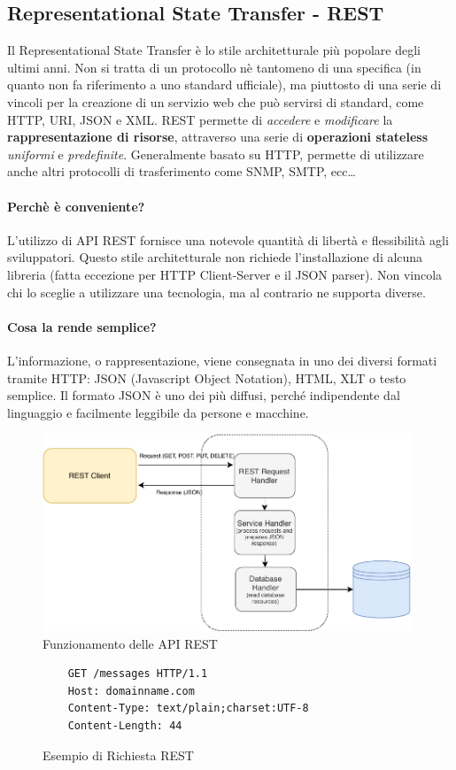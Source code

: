 \subsection{Representational State Transfer - REST}
Il Representational State Transfer è lo stile architetturale più popolare degli ultimi anni. Non si tratta di un protocollo nè tantomeno di una specifica (in quanto non fa riferimento a uno standard ufficiale), ma piuttosto di una serie di vincoli per la creazione di un servizio web che può servirsi di standard,  come HTTP, URI, JSON e XML. REST permette di \textit{accedere} e \textit{modificare} la \textbf{rappresentazione di risorse}, attraverso una serie di \textbf{operazioni stateless} \textit{uniformi} e \textit{predefinite}. Generalmente basato su HTTP, permette di utilizzare anche altri protocolli di trasferimento come SNMP, SMTP, ecc\dots

\paragraph{Perchè è conveniente?} L'utilizzo di API REST fornisce una notevole quantità di libertà e flessibilità agli sviluppatori. Questo stile architetturale non richiede l'installazione di alcuna libreria (fatta eccezione per HTTP Client-Server e il JSON parser). Non vincola  chi lo sceglie a utilizzare una tecnologia, ma al contrario ne supporta diverse.

\paragraph{Cosa la rende semplice?} L'informazione, o rappresentazione, viene consegnata in uno dei diversi formati tramite HTTP: JSON (Javascript Object Notation), HTML, XLT o testo semplice. Il formato JSON è uno dei più diffusi, perché indipendente dal linguaggio e facilmente leggibile da persone e macchine.
\begin{figure}[H]
    \centering
    \includegraphics[width=0.98\textwidth]{images/01_10_restapi.pdf}
    \caption{Funzionamento delle API REST}
    \label{fig:restapi}
\end{figure}
\begin{figure}[H]
    \begin{verbatim}
    GET /messages HTTP/1.1
    Host: domainname.com
    Content-Type: text/plain;charset:UTF-8
    Content-Length: 44
\end{verbatim}
    \caption{Esempio di Richiesta REST}
    \label{fig:restrequest}
\end{figure}

